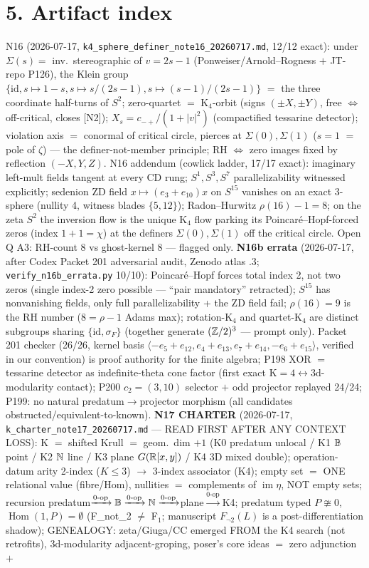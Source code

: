 \documentclass[10pt]{article}
\begin{document}
\section*{5. Artifact index}
N16 (2026-07-17, \texttt{k4\_sphere\_definer\_note16\_20260717.md}, 12/12 exact): under $\Sigma(s)=$ inv.\ stereographic of $v=2s-1$ (Ponweiser/Arnold--Rogness $+$ JT-repo P126), the Klein group $\{\mathrm{id}, s\mapsto1-s, s\mapsto s/(2s-1), s\mapsto(s-1)/(2s-1)\}$ $=$ the three coordinate half-turns of $S^2$; zero-quartet $=$ K$_4$-orbit (signs $(\pm X,\pm Y)$, free $\iff$ off-critical, closes [N2]); $X_s=c_{-+}/(1+|v|^2)$ (compactified tessarine detector); violation axis $=$ conormal of critical circle, pierces at $\Sigma(0),\Sigma(1)$ ($s{=}1$ $=$ pole of $\zeta$) --- the definer-not-member principle; RH $\iff$ zero images fixed by reflection $(-X,Y,Z)$. N16 addendum (cowlick ladder, 17/17 exact): imaginary left-mult fields tangent at every CD rung; $S^1,S^3,S^7$ parallelizability witnessed explicitly; sedenion ZD field $x\mapsto(e_3{+}e_{10})x$ on $S^{15}$ vanishes on an exact 3-sphere (nullity 4, witness blades $\{5,12\}$); Radon--Hurwitz $\rho(16){-}1=8$; on the zeta $S^2$ the inversion flow is the unique K$_4$ flow parking its Poincar\'e--Hopf-forced zeros (index $1{+}1=\chi$) at the definers $\Sigma(0),\Sigma(1)$ off the critical circle. Open Q A3: RH-count 8 vs ghost-kernel 8 --- flagged only. \textbf{N16b errata} (2026-07-17, after Codex Packet 201 adversarial audit, Zenodo atlas .3; \texttt{verify\_n16b\_errata.py} 10/10): Poincar\'e--Hopf forces total index 2, not two zeros (single index-2 zero possible --- ``pair mandatory'' retracted); $S^{15}$ has nonvanishing fields, only full parallelizability + the ZD field fail; $\rho(16)=9$ is the RH number ($8=\rho-1$ Adams max); rotation-K$_4$ and quartet-K$_4$ are distinct subgroups sharing $\{\mathrm{id},\sigma_F\}$ (together generate $(\mathbb Z/2)^3$ --- prompt only). Packet 201 checker (26/26, kernel basis $\langle-e_5{+}e_{12},e_4{+}e_{13},e_7{+}e_{14},-e_6{+}e_{15}\rangle$, verified in our convention) is proof authority for the finite algebra; P198 XOR $=$ tessarine detector as indefinite-theta cone factor (first exact K$=4\leftrightarrow$3d-modularity contact); P200 $c_2{=}(3,10)$ selector $+$ odd projector replayed 24/24; P199: no natural predatum$\to$projector morphism (all candidates obstructed/equivalent-to-known). \textbf{N17 CHARTER} (2026-07-17, \texttt{k\_charter\_note17\_20260717.md} --- READ FIRST AFTER ANY CONTEXT LOSS): K $=$ shifted Krull $=$ geom.\ dim $+1$ (K0 predatum unlocal / K1 $\Bbb B$ point / K2 $\mathbb N$ line / K3 plane $G(\mathbb R[x,y])$ / K4 3D mixed double); operation-datum arity 2-index ($K\le3$) $\to$ 3-index associator (K4); empty set $=$ ONE relational value (fibre/Hom), nullities $=$ complements of $\operatorname{im}\eta$, NOT empty sets; recursion predatum$\xrightarrow{0\text{-op}}\Bbb B\xrightarrow{0\text{-op}}\mathbb N\xrightarrow{0\text{-op}}$plane$\xrightarrow{0\text{-op}}$K4; predatum typed $P\ncong0$, $\operatorname{Hom}(1,P)=\emptyset$ (F\_not\_2 $\ne$ F$_1$; manuscript $F_{\lnot2}(L)$ is a post-differentiation shadow); GENEALOGY: zeta/Giuga/CC emerged FROM the K4 search (not retrofits), 3d-modularity adjacent-groping, poser's core ideas $=$ zero adjunction $+$ 
\end{document}
